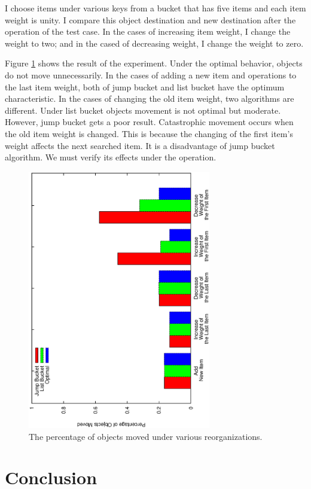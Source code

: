 \documentclass[a4paper,11pt]{article}
\begin{document}
I choose items under various keys from a bucket that has five items and each item weight is unity.
I compare this object destination and new destination after the operation of the test case. In the cases of increasing item weight, I change the weight to two; and in the cased of decreasing weight, I change the weight to zero.

Figure \ref{reorganize} shows the result of the experiment.
Under the optimal behavior, objects do not move unnecessarily.
In the cases of adding a new item and operations to the last item weight, both of jump bucket and list bucket have the optimum characteristic.
In the cases of changing the old item weight, two algorithms are different. Under list bucket objects movement is not optimal but moderate.
However, jump bucket gets a poor result.
Catastrophic movement occurs when the old item weight is changed.
This is because the changing of the first item's weight affects the next searched item.
It is a disadvantage of jump bucket algorithm.
We must verify its effects under the operation.

\begin{figure}[tbp]
  \begin{center}
    \includegraphics[width=80mm, angle=-90]{reorganize.eps}
  \end{center}
  \caption{The percentage of objects moved under various reorganizations.}
  \label{reorganize}
\end{figure}

\section{Conclusion}
\end{document}
